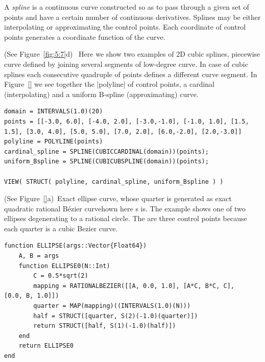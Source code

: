 \begin{coding}[Algebraic computation of FE = $\delta_1$]
{\begin{definition}
A \emph{spline} is a continuous curve constructed so as to pass through a given set of points and have a certain number of continuous derivatives. Splines may be either interpolating or approximating the control points. Each coordinate of control points generates a coordinate function of the curve.
\end{definition}

\begin{condition} (See Figure~\ref{fig:5:7}d)\
\label{\ref{ex:5:4:5}}
Here we show two examples of 2D cubic splines, piecewise curve defined by joining several segments of low-degree curve. In case of cubic splines each consecutive quadruple of points defines a different curve segment. In Figure~\ref{} we see together the |polyline|  of control points, a cardinal (interpolating) and a uniform B-spline (approximating) curve.
\begin{lstlisting}[language=JuliaLocal, style=julia, mathescape=true]
domain = INTERVALS(1.0)(20)
points = [[-3.0, 6.0], [-4.0, 2.0], [-3.0,-1.0], [-1.0, 1.0], [1.5, 1.5], [3.0, 4.0], [5.0, 5.0], [7.0, 2.0], [6.0,-2.0], [2.0,-3.0]]
polyline = POLYLINE(points) 
cardinal_spline = SPLINE(CUBICCARDINAL(domain))(points);
uniform_Bspline = SPLINE(CUBICUBSPLINE(domain))(points);

VIEW( STRUCT( polyline, cardinal_spline, uniform_Bspline ) )
\end{lstlisting}
\end{condition}


\begin{condition}[(Exact ellipse curve] (See Figure~\ref{}a)\
Exact ellipse curve, whose quarter is generated as exact quadratic rational Bézier curvehown here s is. The example shows one of two ellipses degenerating to a rational circle. The are three control points because each quarter is a cubic Bezier curve.
\begin{lstlisting}[language=JuliaLocal, style=julia, mathescape=true]
function ELLIPSE(args::Vector{Float64})
	A, B = args
	function ELLIPSE0(N::Int)
		C = 0.5*sqrt(2)
		mapping = RATIONALBEZIER([[A, 0.0, 1.0], [A*C, B*C, C], 		[0.0, B, 1.0]])
		quarter = MAP(mapping)((INTERVALS(1.0)(N)))
		half = STRUCT([quarter, S(2)(-1.0)(quarter)])
		return STRUCT([half, S(1)(-1.0)(half)])
	end
	return ELLIPSE0
end


\end{lstlisting}
\end{condition}}
\end{coding}
